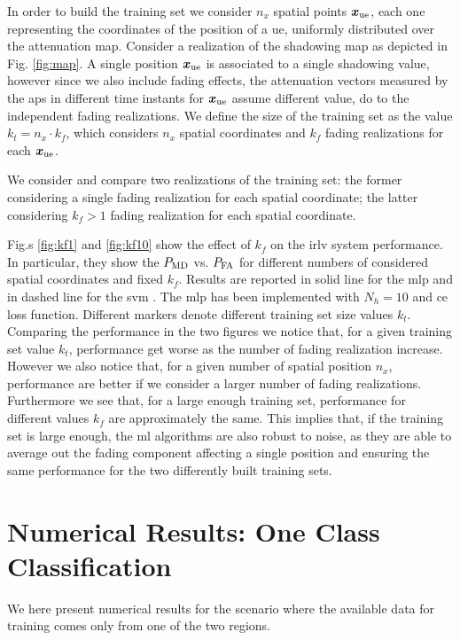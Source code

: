 \documentclass[draftcls,onecolumn,12pt]{IEEEtran}
\begin{document}
In order to build the training set we consider $n_x$ spatial points $\bm{x}_{\rm ue}$, each one representing the coordinates of the position of a \ac{ue}, uniformly distributed over the attenuation map. Consider a realization of the shadowing map as depicted in Fig. \ref{fig:map}. A single position $\bm{x}_{\rm ue}$ is associated to a single shadowing value, however since we also include fading effects, the attenuation vectors measured by the \acp{ap} in different time instants for $\bm{x}_{\rm ue}$ assume different value, do to the independent fading realizations. We define the size of the training set as the value $k_t = n_x \cdot k_f$, which considers $n_x$ spatial coordinates and $k_f$ fading realizations for each $\bm{x}_{\rm ue}$.

We consider and compare two realizations of the training set: the former considering a single fading realization for each spatial coordinate; the latter considering $k_f > 1$ fading realization for each spatial coordinate. 

Fig.s \ref{fig:kf1} and \ref{fig:kf10} show the effect of $k_f$ on the \ac{irlv} system performance. In particular, they show the $P_{\rm MD}$ vs. $P_{\rm FA}$ for different numbers of considered spatial coordinates and fixed $k_f$. Results are reported in solid line for the \ac{mlp} and in dashed line for the \ac{svm} . The \ac{mlp} has been implemented with $N_h=10$ and \ac{ce} loss function. Different markers denote different training set size values $k_t$. Comparing the performance in the two figures we notice that, for a given training set value $k_t$, performance get worse as the number of fading realization increase. However we also notice that, for a given number of spatial position $n_x$, performance are better if we consider a larger number of fading realizations. Furthermore we see that, for a large enough training set, performance for different values $k_f$ are approximately the same. This implies that, if the training set is large enough, the \ac{ml} algorithms are also robust to noise, as they are able to average out the fading component affecting a single position and ensuring the same performance for the two differently built training sets. 


\section{Numerical Results: One Class Classification}
We here present numerical results for the scenario where the available data for training comes only from one of the two regions. 
\end{document}
